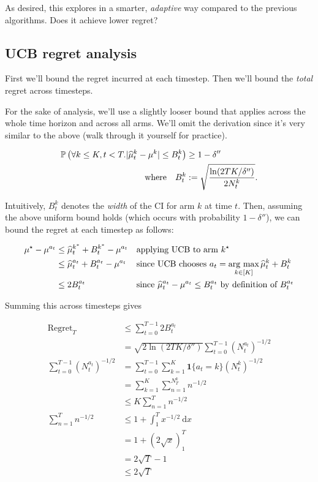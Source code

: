 \documentclass[\main/main]{subfiles}
\begin{document}
As desired, this explores in a smarter, \emph{adaptive} way compared to the previous algorithms. Does it achieve lower regret?

\subsection{UCB regret analysis}

First we'll bound the regret incurred at each timestep. Then we'll bound the \emph{total} regret across timesteps.

For the sake of analysis, we'll use a slightly looser bound that applies across the whole time horizon and across all arms. We'll omit the derivation since it's very similar to the above (walk through it yourself for practice).

\begin{align*}
    \P\left(\forall k \le K, t < T. |\hat \mu^k_t - \mu^k | \le B^k_t \right) &\ge 1-\delta'' \\
    \text{where} \quad B^k_t &:= \sqrt{\frac{\ln(2TK/\delta'')}{2N^k_t}}.
\end{align*}

Intuitively, $B^k_t$ denotes the \emph{width} of the CI for arm $k$ at time $t$. Then, assuming the above uniform bound holds (which occurs with probability $1-\delta''$), we can bound the regret at each timestep as follows:

\begin{align*}
    \mu^\star - \mu^{a_t} &\le \hat \mu^{k^*}_t + B_t^{k^*} - \mu^{a_t} && \text{applying UCB to arm } k^\star \\
    &\le \hat \mu^{a_t}_t + B^{a_t}_t - \mu^{a_t} && \text{since UCB chooses } a_t = \argmax_{k \in [K]} \hat \mu^k_t + B_t^{k} \\
    &\le 2 B^{a_t}_t && \text{since } \hat \mu^{a_t}_t - \mu^{a_t} \le B^{a_t}_t \text{ by definition of } B^{a_t}_t \\
\end{align*}

Summing this across timesteps gives

\begin{align*}
    \text{Regret}_T &\le \sum_{t=0}^{T-1} 2 B^{a_t}_t \\
    &= \sqrt{2\ln(2TK/\delta'')} \sum_{t=0}^{T-1} (N^{a_t}_t)^{-1/2} \\
    \sum_{t=0}^{T-1} (N^{a_t}_t)^{-1/2} &= \sum_{t=0}^{T-1} \sum_{k=1}^K \mathbf{1}\{ a_t = k \} (N^k_t)^{-1/2} \\
    &= \sum_{k=1}^K \sum_{n=1}^{N_T^k} n^{-1/2} \\
    &\le K \sum_{n=1}^T n^{-1/2} \\
    \sum_{n=1}^T n^{-1/2} &\le 1 + \int_1^T x^{-1/2} \ \mathrm{d}x \\
    &= 1 + (2 \sqrt{x})_1^T \\
    &= 2 \sqrt{T} - 1 \\
    &\le 2 \sqrt{T} \\
\end{align*}
\end{document}

